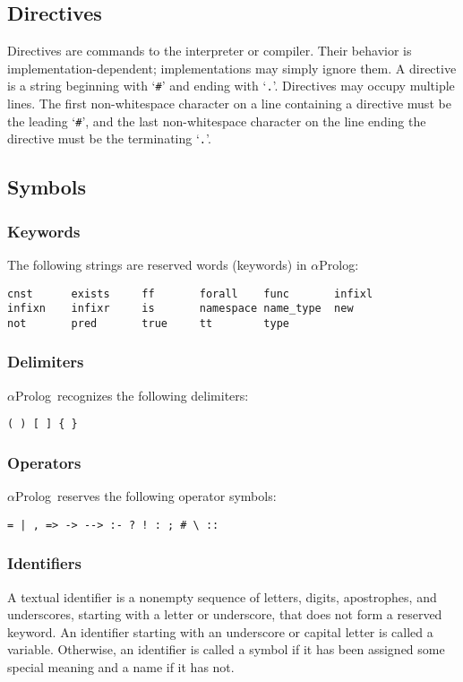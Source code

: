 \documentclass[draft,12pt]{report}
\newcommand{\aprolog}{$\alpha${Prolog}\xspace}
\begin{document}
\subsection{Directives}
Directives are commands to the interpreter or compiler.  Their
behavior is implementation-dependent; implementations may simply
ignore them.  A directive is a string beginning with `\verb|#|' and
ending with `\verb|.|'.  Directives may occupy multiple lines.  The
first non-whitespace character on a line containing a directive must
be the leading `\verb|#|', and the last non-whitespace character on
the line ending the directive must be the terminating `\verb|.|'.

\subsection{Symbols}
\subsubsection{Keywords}

The following strings are reserved words (keywords) in \aprolog:
\begin{verbatim}
cnst      exists     ff       forall    func       infixl    
infixn    infixr     is       namespace name_type  new      
not       pred       true     tt        type      
\end{verbatim}

\subsubsection{Delimiters}
\aprolog\ recognizes the following delimiters:
\begin{verbatim}
( ) [ ] { }
\end{verbatim}

\subsubsection{Operators}
\aprolog\ reserves the following operator symbols:
\begin{verbatim}
= | , => -> --> :- ? ! : ; # \ ::
\end{verbatim}

\subsubsection{Identifiers}

A textual identifier is a nonempty sequence of letters, digits,
apostrophes, and underscores, starting with a letter or underscore,
that does not form a reserved keyword.  An identifier starting with an
underscore or capital letter is called a variable.  Otherwise, an
identifier is called a symbol if it has been assigned some special
meaning and a name if it has not.
\end{document}
